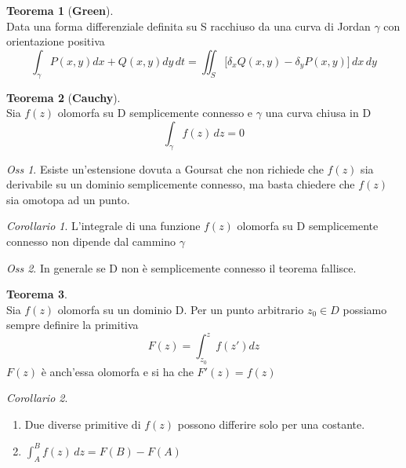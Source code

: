 \documentclass[a4paper,11pt]{report}
\theoremstyle{remark}
\newtheorem*{oss}{Oss}
\newtheorem*{coro}{Corollario}
\theoremstyle{definition}
\newtheorem*{teo}{Teorema}
\begin{document}
	\begin{teo}[\textbf{Green}]\hfil\\
		Data una forma differenziale definita su S racchiuso da una curva di Jordan $\gamma$ con orientazione positiva 
		\begin{equation}
			\int_\gamma P(x,y)dx + Q(x,y)dy\,dt = \iint_S \bigl[\delta_x Q(x,y)- \delta_y P(x,y)\bigr]\,dx\,dy
		\end{equation}
	\end{teo}

	\begin{teo}[\textbf{Cauchy}]\hfil\\
		Sia $f(z)$ olomorfa su D semplicemente connesso e $\gamma$ una curva chiusa in D 
		\begin{equation*}
			\int_\gamma f(z)\,dz = 0
		\end{equation*}
	\end{teo}

	\begin{oss}
		Esiste un'estensione dovuta a Goursat che non richiede che $f(z)$ sia derivabile su un dominio semplicemente connesso, ma basta chiedere che $f(z)$ sia omotopa ad un punto.
	\end{oss}

	\begin{coro}
		L'integrale di una funzione $f(z)$ olomorfa su D semplicemente connesso non dipende dal cammino $\gamma$
	\end{coro}

	\begin{oss}
		In generale se D non è semplicemente connesso il teorema fallisce.
	\end{oss}
	\begin{teo}\hfil\\
		Sia $f(z)$ olomorfa su un dominio D. Per un punto arbitrario $z_0 \in D $ possiamo sempre definire la primitiva 
		\begin{equation*}
			F(z)=\int_{z_0}^{z} f(z')dz
		\end{equation*}
		$F(z)$ è anch'essa olomorfa e si ha che $F'(z)= f(z)$
	\end{teo}

	\begin{coro}\hfil
		\begin{enumerate}
			\item Due diverse primitive di $f(z)$ possono differire solo per una costante.
			\item $\int_{A}^{B} f(z)\,dz = F(B)-F(A)$
		\end{enumerate}
	\end{coro}
\end{document}
